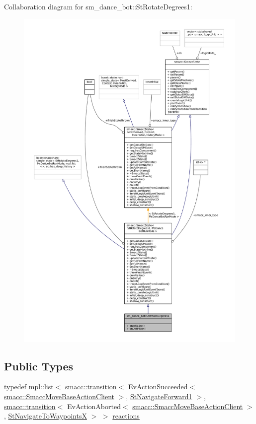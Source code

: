 Collaboration diagram for sm\+\_\+dance\+\_\+bot\+:\+:St\+Rotate\+Degrees1\+:
\nopagebreak
\begin{figure}[H]
\begin{center}
\leavevmode
\includegraphics[width=350pt]{structsm__dance__bot_1_1StRotateDegrees1__coll__graph}
\end{center}
\end{figure}
\subsection*{Public Types}
\begin{DoxyCompactItemize}
\item 
typedef mpl\+::list$<$ \hyperlink{classsmacc_1_1transition}{smacc\+::transition}$<$ Ev\+Action\+Succeeded$<$ \hyperlink{classsmacc_1_1SmaccMoveBaseActionClient}{smacc\+::\+Smacc\+Move\+Base\+Action\+Client} $>$, \hyperlink{structsm__dance__bot_1_1StNavigateForward1}{St\+Navigate\+Forward1} $>$, \hyperlink{classsmacc_1_1transition}{smacc\+::transition}$<$ Ev\+Action\+Aborted$<$ \hyperlink{classsmacc_1_1SmaccMoveBaseActionClient}{smacc\+::\+Smacc\+Move\+Base\+Action\+Client} $>$, \hyperlink{structsm__dance__bot_1_1StNavigateToWaypointsX}{St\+Navigate\+To\+WaypointsX} $>$ $>$ \hyperlink{structsm__dance__bot_1_1StRotateDegrees1_a47cddc91cfe538fc5f88847982029bce}{reactions}
\end{DoxyCompactItemize}
